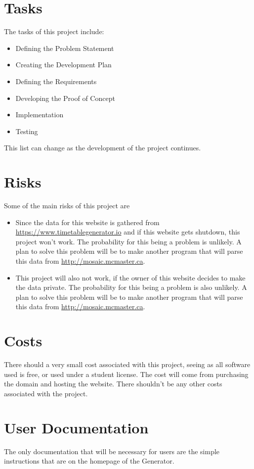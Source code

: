 \documentclass[12pt]{article}
\begin{document}
\section{Tasks}
The tasks of this project include:
\begin{itemize}
  \item Defining the Problem Statement
  \item Creating the Development Plan
  \item Defining the Requirements
  \item Developing the Proof of Concept
  \item Implementation
  \item Testing
\end{itemize}
This list can change as the development of the project continues.

\section{Risks}
    Some of the main risks of this project are 
    
    \begin{itemize}
        \item 
        Since the data for this website is gathered from \url{https://www.timetablegenerator.io} and if this website gets shutdown, this project won't work. The probability for this being a problem is unlikely. A plan to solve this problem will be to make another program that will parse this data from \url{http://mosaic.mcmaster.ca}.
        \item
        This project will also not work, if the owner of this website decides to make the data private. The probability for this being a problem is also unlikely. A plan to solve this problem will be to make another program that will parse this data from \url{http://mosaic.mcmaster.ca}.
        
    \end{itemize}
\section{Costs}
There should a very small cost associated with this project, seeing as all software used is free, or used under a student license. The cost will come from purchasing the domain and hosting the website. There shouldn't be any other costs associated with the project.
\section{User Documentation}
The only documentation that will be necessary for users are the simple instructions that are on the homepage of the Generator. 



\begin{thebibliography}{9}


 
\end{thebibliography}
\end{document}
